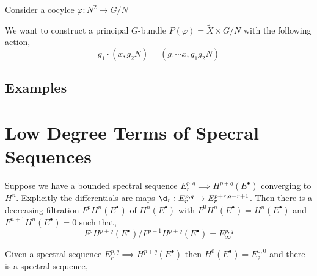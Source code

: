 \documentclass[12pt]{article}
\begin{document}
Consider a cocylce $\varphi : N^2 \to G/N$ 

We want to construct a principal $G$-bundle $P(\varphi) = \tilde{X} \times G/N$ with the following action,
\[ g_1 \cdot (x, g_2 N) = (g_1 \cdots x, g_1 g_2 N) \]

\subsection{Examples}

\section{Low Degree Terms of Specral Sequences}

Suppose we have a bounded spectral sequence $E_r^{p,q} \implies H^{p+q}(E^\bullet)$ converging to $H^n$. Explicitly the differentials are maps $\d_r : E^{p,q}_r \to E^{p + r, q - r + 1}_r$. Then there is a decreasing filtration $F^p H^{n}(E^\bullet)$ of $H^n(E^\bullet)$ with $F^0 H^n(E^\bullet) = H^n(E^\bullet)$ and $F^{n+1} H^n(E^\bullet) = 0$ such that,
\[ F^{p} H^{p+q}(E^\bullet) / F^{p+1} H^{p+q}(E^\bullet) = E_\infty^{p,q} \] 
\begin{prop}
Given a spectral sequence $E^{p,q}_r \implies H^{p+q}(E^\bullet)$ then $H^0(E^\bullet) = E^{0,0}_2$ and there is a spectral sequence,
\begin{center}
\end{center}
\end{prop}
\end{document}
